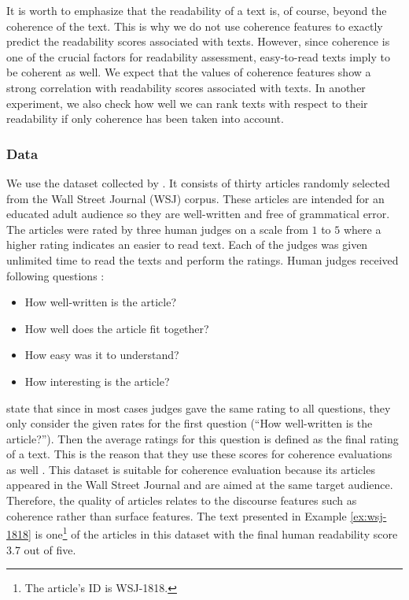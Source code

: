 It is worth to emphasize that the readability of a text is, of course, beyond the coherence of the text. 
This is why we do not use coherence features to exactly predict the readability scores associated with texts. 
However, since coherence is one of the crucial factors for readability assessment, easy-to-read texts imply to be coherent as well. 
We expect that the values of coherence features show a strong correlation with readability scores associated with texts. 
In another experiment, we also check how well we can rank texts with respect to their readability if only coherence has been taken into account. 


\subsubsection{Data}
\label{sec:data_pitler}
We use the dataset collected by . 
It consists of thirty articles randomly selected from the Wall Street Journal (WSJ) corpus. 
These articles are intended for an educated adult audience so they are well-written and free of grammatical error. 
The articles were rated by three human judges on a scale from $1$ to $5$ where a higher rating indicates an easier to read text. 
Each of the judges was given unlimited time to read the texts and perform the ratings. 
Human judges received following questions \cite{pitler08}:
\begin{itemize}
	\item How well-written is the article?
	\item How well does the article fit together?
	\item How easy was it to understand?
	\item How interesting is the article?
\end{itemize} 
 
 state that since in most cases judges gave the same rating to all questions, they only consider the given rates for the first question (``How well-written is the article?''). 
Then the average ratings for this question is defined as the final rating of a text. 
This is the reason that they use these scores for coherence evaluations as well \cite{pitler08}. 
This dataset is suitable for coherence evaluation because its articles appeared in the Wall Street Journal and are aimed at the same target audience. 
Therefore, the quality of articles relates to the discourse features such as coherence rather than surface features. 
The text presented in Example \ref{ex:wsj-1818} is one\footnote{The article's ID is WSJ-1818.} of the articles in this dataset with the final human readability score 3.7 out of five.  


